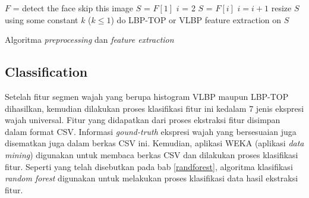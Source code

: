 \documentclass[review,3p,12pt,times]{elsarticle}
\begin{document}
\begin{algorithm}[hbt!]
\begin{spacing}{1}
\begin{algorithmic}[1]
\STATE $F$ = detect the face
	\STATE skip this image
\ELSE 
	\STATE $S$ = $F[1]$
		\STATE $i$ = 2
			\STATE $S$ = $F[i]$
			\STATE $i = i+1$
		\ENDWHILE
	\ENDIF
	\STATE resize $S$ using some constant $k$ ($k \leq 1$)
	\STATE do LBP-TOP or VLBP feature extraction on $S$
\ENDIF
\end{algorithmic}
\caption{Algoritma \textit{preprocessing} dan \textit{feature extraction}}
\label{alg:test}
\end{spacing}

\end{algorithm}



\subsection{Classification}
\label{classification}

Setelah fitur segmen wajah yang berupa histogram VLBP maupun LBP-TOP dihasilkan, kemudian dilakukan proses klasifikasi fitur ini kedalam 7 jenis ekspresi wajah universal. Fitur yang didapatkan dari proses ekstraksi fitur disimpan dalam format CSV. Informasi \textit{gound-truth} ekspresi wajah yang bersesuaian juga disematkan juga dalam berkas CSV ini. Kemudian, aplikasi WEKA (aplikasi \textit{data mining}) digunakan untuk membaca berkas CSV dan dilakukan proses klasifikasi fitur. Seperti yang telah disebutkan pada bab \ref{randforest}, algoritma klasifikasi \textit{random forest} digunakan untuk melakukan proses klasifikasi data hasil ekstraksi fitur.

\end{document}
